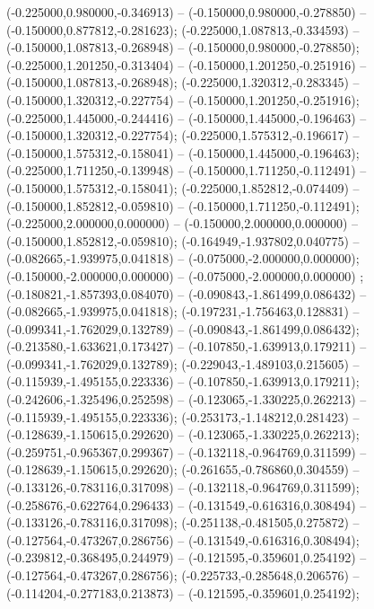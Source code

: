  (-0.225000,0.980000,-0.346913) -- (-0.150000,0.980000,-0.278850) -- (-0.150000,0.877812,-0.281623);
 (-0.225000,1.087813,-0.334593) -- (-0.150000,1.087813,-0.268948) -- (-0.150000,0.980000,-0.278850);
 (-0.225000,1.201250,-0.313404) -- (-0.150000,1.201250,-0.251916) -- (-0.150000,1.087813,-0.268948);
 (-0.225000,1.320312,-0.283345) -- (-0.150000,1.320312,-0.227754) -- (-0.150000,1.201250,-0.251916);
 (-0.225000,1.445000,-0.244416) -- (-0.150000,1.445000,-0.196463) -- (-0.150000,1.320312,-0.227754);
 (-0.225000,1.575312,-0.196617) -- (-0.150000,1.575312,-0.158041) -- (-0.150000,1.445000,-0.196463);
 (-0.225000,1.711250,-0.139948) -- (-0.150000,1.711250,-0.112491) -- (-0.150000,1.575312,-0.158041);
 (-0.225000,1.852812,-0.074409) -- (-0.150000,1.852812,-0.059810) -- (-0.150000,1.711250,-0.112491);
 (-0.225000,2.000000,0.000000) -- (-0.150000,2.000000,0.000000) -- (-0.150000,1.852812,-0.059810);
 (-0.164949,-1.937802,0.040775) -- (-0.082665,-1.939975,0.041818) -- (-0.075000,-2.000000,0.000000);
 (-0.150000,-2.000000,0.000000) -- (-0.075000,-2.000000,0.000000) ;
 (-0.180821,-1.857393,0.084070) -- (-0.090843,-1.861499,0.086432) -- (-0.082665,-1.939975,0.041818);
 (-0.197231,-1.756463,0.128831) -- (-0.099341,-1.762029,0.132789) -- (-0.090843,-1.861499,0.086432);
 (-0.213580,-1.633621,0.173427) -- (-0.107850,-1.639913,0.179211) -- (-0.099341,-1.762029,0.132789);
 (-0.229043,-1.489103,0.215605) -- (-0.115939,-1.495155,0.223336) -- (-0.107850,-1.639913,0.179211);
 (-0.242606,-1.325496,0.252598) -- (-0.123065,-1.330225,0.262213) -- (-0.115939,-1.495155,0.223336);
 (-0.253173,-1.148212,0.281423) -- (-0.128639,-1.150615,0.292620) -- (-0.123065,-1.330225,0.262213);
 (-0.259751,-0.965367,0.299367) -- (-0.132118,-0.964769,0.311599) -- (-0.128639,-1.150615,0.292620);
 (-0.261655,-0.786860,0.304559) -- (-0.133126,-0.783116,0.317098) -- (-0.132118,-0.964769,0.311599);
 (-0.258676,-0.622764,0.296433) -- (-0.131549,-0.616316,0.308494) -- (-0.133126,-0.783116,0.317098);
 (-0.251138,-0.481505,0.275872) -- (-0.127564,-0.473267,0.286756) -- (-0.131549,-0.616316,0.308494);
 (-0.239812,-0.368495,0.244979) -- (-0.121595,-0.359601,0.254192) -- (-0.127564,-0.473267,0.286756);
 (-0.225733,-0.285648,0.206576) -- (-0.114204,-0.277183,0.213873) -- (-0.121595,-0.359601,0.254192);
